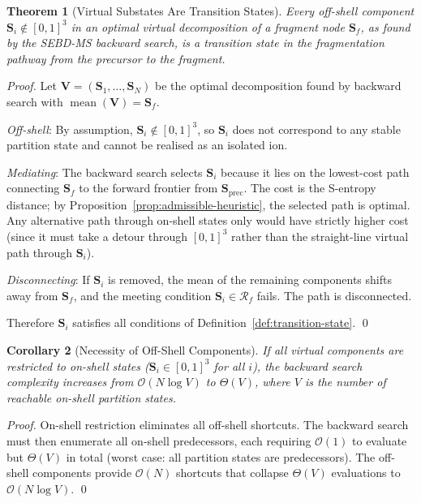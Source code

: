 \documentclass[twocolumn,10pt,a4paper]{article}
\theoremstyle{thmstyle}
\newtheorem{theorem}{Theorem}[section]
\newtheorem{corollary}[theorem]{Corollary}
\theoremstyle{definition}
\theoremstyle{remark}
\newcommand{\Sv}{\mathbf{S}}
\newcommand{\Reachf}{\mathcal{R}_f}
\DeclareMathOperator{\mean}{mean}
\begin{document}
\begin{theorem}[Virtual Substates Are Transition States]
\label{thm:virtual-ts}
Every off-shell component $\Sv_i \notin [0,1]^3$ in an optimal virtual
decomposition of a fragment node $\Sv_f$, as found by the SEBD-MS
backward search, is a transition state in the fragmentation pathway
from the precursor to the fragment.
\end{theorem}

\begin{proof}
Let $\mathbf{V} = (\Sv_1, \ldots, \Sv_N)$ be the optimal decomposition
found by backward search with $\mean(\mathbf{V}) = \Sv_f$.

\textit{Off-shell}: By assumption, $\Sv_i \notin [0,1]^3$, so $\Sv_i$
does not correspond to any stable partition state and cannot be realised
as an isolated ion.

\textit{Mediating}: The backward search selects $\Sv_i$ because it
lies on the lowest-cost path connecting $\Sv_f$ to the forward
frontier from $\Sv_\text{prec}$. The cost is the S-entropy distance;
by Proposition~\ref{prop:admissible-heuristic}, the selected path is
optimal. Any alternative path through on-shell states only would have
strictly higher cost (since it must take a detour through $[0,1]^3$
rather than the straight-line virtual path through $\Sv_i$).

\textit{Disconnecting}: If $\Sv_i$ is removed, the mean of the remaining
components shifts away from $\Sv_f$, and the meeting condition
$\Sv_i \in \Reachf$ fails. The path is disconnected.

Therefore $\Sv_i$ satisfies all conditions of Definition~\ref{def:transition-state}.
\qed
\end{proof}

\begin{corollary}[Necessity of Off-Shell Components]
\label{cor:necessity}
If all virtual components are restricted to on-shell states
($\Sv_i \in [0,1]^3$ for all $i$), the backward search complexity
increases from $\mathcal{O}(N \log V)$ to $\Theta(V)$, where $V$ is
the number of reachable on-shell partition states.
\end{corollary}

\begin{proof}
On-shell restriction eliminates all off-shell shortcuts. The backward
search must then enumerate all on-shell predecessors, each requiring
$\mathcal{O}(1)$ to evaluate but $\Theta(V)$ in total (worst case: all
partition states are predecessors). The off-shell components provide
$\mathcal{O}(N)$ shortcuts that collapse $\Theta(V)$ evaluations to
$\mathcal{O}(N \log V)$. \qed
\end{proof}
\end{document}
